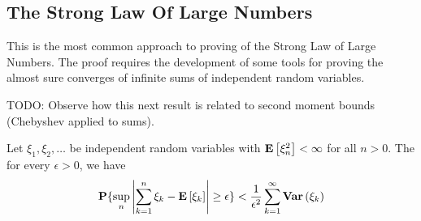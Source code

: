 \subsection{The Strong Law Of Large Numbers}

This is the most common approach to proving of the Strong Law of Large
Numbers.  The proof requires the development of some tools for proving
the almost sure converges of infinite sums of independent random
variables.

TODO: Observe how this next result is related to second moment bounds (Chebyshev
applied to sums).

\begin{lem}\label{KolmogorovMaximalInequality}Let
  $\xi_1, \xi_2, \dots$ be independent random variables with
  $\textbf{E}\left[\xi_n^2\right] < \infty$ for all $n>0$.  The for every
  $\epsilon > 0$, we have
\begin{align*}
\textbf{P}\{\sup_n \left \vert \sum_{k=1}^n \xi_k - \textbf{E}\left[\xi_k\right] \right \vert
  \geq \epsilon\} < \frac{1}{\epsilon^2} \sum_{k=1}^\infty \textbf{Var} \left (\xi_k \right )
\end{align*}
\end{lem}
